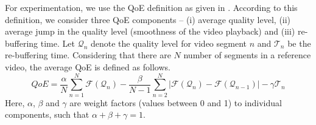 For experimentation, we use the QoE definition as given in \cite{Pensieve}. According to this definition, we consider three QoE components -- (i) average quality level, (ii) average jump in the quality level (smoothness of the video playback) and (iii) re-buffering time. Let $\mathcal{Q}_n$ denote the quality level for video segment $n$ and $\mathcal{T}_n$ be the re-buffering time. Considering that there are $N$ number of segments in a reference video, the average QoE is defined as follows. 
\begin{equation}
QoE = \frac{\alpha}{N}\sum_{n=1}^{N} \mathcal{F}(\mathcal{Q}_n) - \frac{\beta}{N-1} \sum_{n=2}^{N}\lvert\mathcal{F}(\mathcal{Q}_n) -\mathcal{F}(\mathcal{Q}_{n-1})\rvert - \gamma\mathcal{T}_n
\label{eqn:QoE}
\end{equation}
Here, $\alpha$, $\beta$ and $\gamma$ are weight factors (values between 0 and 1) to individual components, such that $\alpha + \beta + \gamma = 1$. 
%
